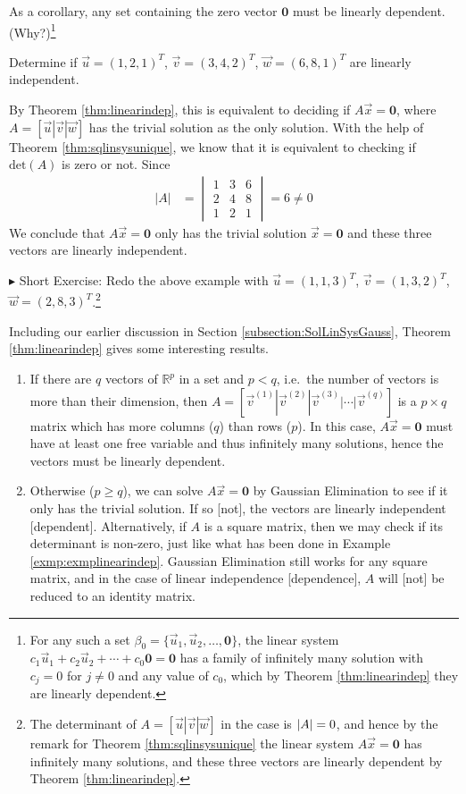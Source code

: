 As a corollary, any set containing the zero vector $\textbf{0}$ must be linearly dependent. (Why?)\footnote{For any such a set $\mathcal{\beta}_0 = \{\vec{u}_1, \vec{u}_2, \ldots, \textbf{0}\}$, the linear system $c_1\vec{u}_1 + c_2\vec{u}_2 + \cdots + c_0\textbf{0} = \textbf{0}$ has a family of infinitely many solution with $c_j = 0$ for $j \neq 0$ and any value of $c_0$, which by Theorem \ref{thm:linearindep} they are linearly dependent.}
\begin{exmp}
\label{exmp:exmplinearindep}
Determine if $\vec{u} = (1,2,1)^T$, $\vec{v} = (3,4,2)^T$, $\vec{w} = (6,8,1)^T$ are linearly independent.
\end{exmp}
By Theorem \ref{thm:linearindep}, this is equivalent to deciding if $A\vec{x} = \textbf{0}$, where $A = [\vec{u}|\vec{v}|\vec{w}]$ has the trivial solution as the only solution. With the help of Theorem \ref{thm:sqlinsysunique}, we know that it is equivalent to checking if $\text{det}(A)$ is zero or not. Since
\begin{align*}
|A| &=
\begin{vmatrix}
1 & 3 & 6\\
2 & 4 & 8 \\
1 & 2 & 1
\end{vmatrix} = 6 \neq 0
\end{align*}
We conclude that $A\vec{x} = \textbf{0}$ only has the trivial solution $\vec{x} = \textbf{0}$ and these three vectors are linearly independent. \par
$\blacktriangleright$ Short Exercise: Redo the above example with $\vec{u} = (1,1,3)^T$, $\vec{v} = (1,3,2)^T$, $\vec{w} = (2,8,3)^T$.\footnote{The determinant of $A = [\vec{u}|\vec{v}|\vec{w}]$ in the case is $\abs{A} = 0$, and hence by the remark for Theorem \ref{thm:sqlinsysunique} the linear system $A\vec{x} = \textbf{0}$ has infinitely many solutions, and these three vectors are linearly dependent by Theorem \ref{thm:linearindep}.}\par
Including our earlier discussion in Section \ref{subsection:SolLinSysGauss}, Theorem \ref{thm:linearindep} gives some interesting results.
\begin{enumerate}
\item If there are $q$ vectors of $\mathbb{R}^p$ in a set and $p < q$, i.e.\ the number of vectors is more than their dimension, then $A = [\vec{v}^{(1)}|\vec{v}^{(2)}|\vec{v}^{(3)}|\cdots|\vec{v}^{(q)}]$ is a $p \times q$ matrix which has more columns ($q$) than rows ($p$). In this case, $A\vec{x} = \textbf{0}$ must have at least one free variable and thus infinitely many solutions, hence the vectors must be linearly dependent.
\item Otherwise ($p \geq q$), we can solve $A\vec{x} = \textbf{0}$ by Gaussian Elimination to see if it only has the trivial solution. If so [not], the vectors are linearly independent [dependent]. Alternatively, if $A$ is a square matrix, then we may check if its determinant is non-zero, just like what has been done in Example \ref{exmp:exmplinearindep}. Gaussian Elimination still works for any square matrix, and in the case of linear independence [dependence], $A$ will [not] be reduced to an identity matrix.
\end{enumerate}
